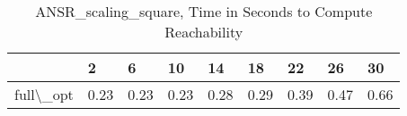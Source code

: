 \begin{table}
\centering
\caption{ANSR\_scaling\_square, Time in Seconds to Compute Reachability}
\label{ANSR_scaling_square_states_time}
\begin{tabular}{lllllllll}
\toprule
{} &     2 &     6 &    10 &    14 &    18 &    22 &    26 &    30 \\
\midrule
full\textbackslash \_opt &  0.23 &  0.23 &  0.23 &  0.28 &  0.29 &  0.39 &  0.47 &  0.66 \\
\bottomrule
\end{tabular}
\end{table}
